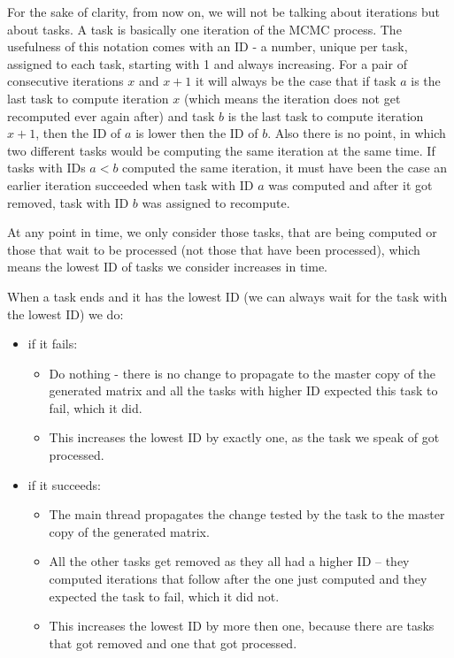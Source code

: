 For the sake of clarity, from now on, we will not be talking about iterations but about tasks. A task is basically one iteration of the MCMC process. The usefulness of this notation comes with an ID - a number, unique per task, assigned to each task, starting with 1 and always increasing. For a pair of consecutive iterations $x$ and $x+1$ it will always be the case that if task $a$ is the last task to compute iteration $x$ (which means the iteration does not get recomputed ever again after) and task $b$ is the last task to compute iteration $x+1$, then the ID of $a$ is lower then the ID of $b$. Also there is no point, in which two different tasks would be computing the same iteration at the same time. If tasks with IDs $a<b$ computed the same iteration, it must have been the case an earlier iteration succeeded when task with ID $a$ was computed and after it got removed, task with ID $b$ was assigned to recompute.

At any point in time, we only consider those tasks, that are being computed or those that wait to be processed (not those that have been processed), which means the lowest ID of tasks we consider increases in time.

When a task ends and it has the lowest ID (we can always wait for the task with the lowest ID) we do:
\begin{itemize}
\item if it fails:
\begin{itemize}
\item Do nothing - there is no change to propagate to the master copy of the generated matrix and all the tasks with higher ID expected this task to fail, which it did.
\item This increases the lowest ID by exactly one, as the task we speak of got processed.
\end{itemize}
\item if it succeeds: 
\begin{itemize}
\item The main thread propagates the change tested by the task to the master copy of the generated matrix.
\item All the other tasks get removed as they all had a higher ID -- they computed iterations that follow after the one just computed and they expected the task to fail, which it did not.
\item This increases the lowest ID by more then one, because there are tasks that got removed and one that got processed.
\end{itemize}
\end{itemize}


